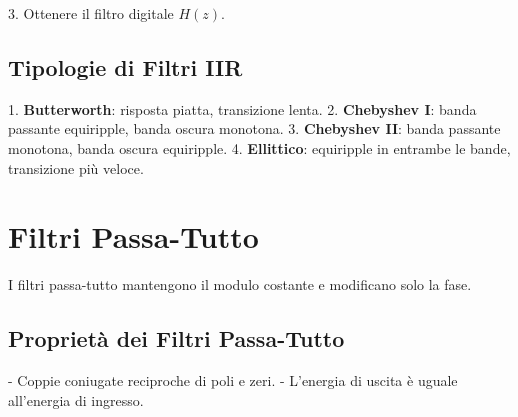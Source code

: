 3. Ottenere il filtro digitale \( H(z) \).

\subsection*{Tipologie di Filtri IIR}

1. \textbf{Butterworth}: risposta piatta, transizione lenta.
2. \textbf{Chebyshev I}: banda passante equiripple, banda oscura monotona.
3. \textbf{Chebyshev II}: banda passante monotona, banda oscura equiripple.
4. \textbf{Ellittico}: equiripple in entrambe le bande, transizione più veloce.

\section{Filtri Passa-Tutto}

I filtri passa-tutto mantengono il modulo costante e modificano solo la fase.

\subsection*{Proprietà dei Filtri Passa-Tutto}

- Coppie coniugate reciproche di poli e zeri.
- L'energia di uscita è uguale all'energia di ingresso.

